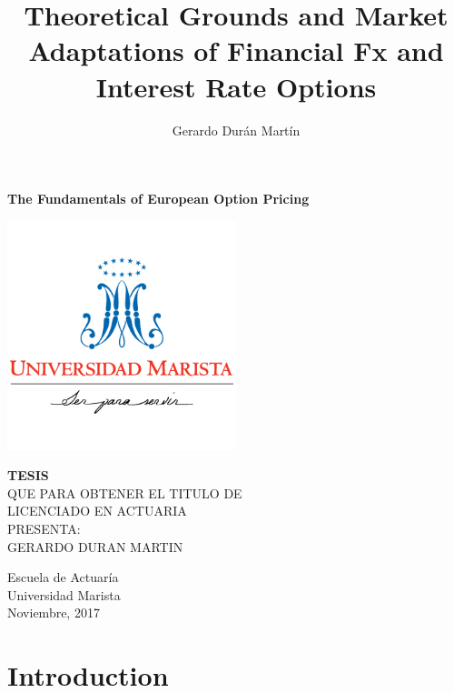\documentclass[11pt]{report}
\title{Theoretical Grounds and Market Adaptations of Financial Fx and Interest Rate Options}
\author{Gerardo Dur\'an Mart\'in}
\begin{document}
\begin{titlepage}
    \begin{center}
        \vspace*{1cm}
        
        \Huge
        \textbf{The Fundamentals of European Option Pricing}
        \LARGE
        
        \includegraphics[width=0.5\textwidth]{../misc/UMA_logo}
        \vspace{0.5cm}
        
        \textbf{TESIS}\\
        QUE PARA OBTENER EL TITULO DE\\
        LICENCIADO EN ACTUARIA\\
        \vspace{0.3cm}
        PRESENTA:\\
        GERARDO DURAN MARTIN
                
        \vspace{0.8cm}
        
        \Large
        Escuela de Actuaría\\
        Universidad Marista\\
        Noviembre, 2017
        
    \end{center}
\end{titlepage}



\tableofcontents

\chapter*{Introduction}

\end{document}
